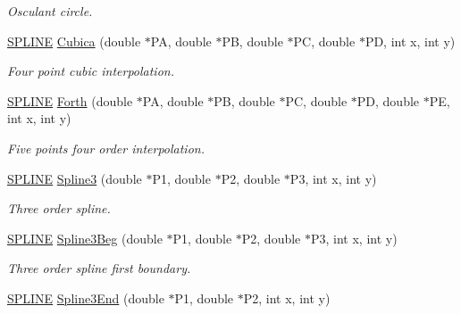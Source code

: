 \begin{DoxyCompactItemize}
\begin{DoxyCompactList}\small\item\em \-Osculant circle. \end{DoxyCompactList}\item 
\hypertarget{classMatematica_acc21ee420953fcc9d0587f56324631cb}{\hyperlink{structSPLINE}{\-S\-P\-L\-I\-N\-E} \hyperlink{classMatematica_acc21ee420953fcc9d0587f56324631cb}{\-Cubica} (double $\ast$\-P\-A, double $\ast$\-P\-B, double $\ast$\-P\-C, double $\ast$\-P\-D, int x, int y)}\label{classMatematica_acc21ee420953fcc9d0587f56324631cb}

\begin{DoxyCompactList}\small\item\em \-Four point cubic interpolation. \end{DoxyCompactList}\item 
\hypertarget{classMatematica_a7eb694853e69b9cbd2020788e9665424}{\hyperlink{structSPLINE}{\-S\-P\-L\-I\-N\-E} \hyperlink{classMatematica_a7eb694853e69b9cbd2020788e9665424}{\-Forth} (double $\ast$\-P\-A, double $\ast$\-P\-B, double $\ast$\-P\-C, double $\ast$\-P\-D, double $\ast$\-P\-E, int x, int y)}\label{classMatematica_a7eb694853e69b9cbd2020788e9665424}

\begin{DoxyCompactList}\small\item\em \-Five points four order interpolation. \end{DoxyCompactList}\item 
\hypertarget{classMatematica_a69f1211856d5b0cd58178a21156d0492}{\hyperlink{structSPLINE}{\-S\-P\-L\-I\-N\-E} \hyperlink{classMatematica_a69f1211856d5b0cd58178a21156d0492}{\-Spline3} (double $\ast$\-P1, double $\ast$\-P2, double $\ast$\-P3, int x, int y)}\label{classMatematica_a69f1211856d5b0cd58178a21156d0492}

\begin{DoxyCompactList}\small\item\em \-Three order spline. \end{DoxyCompactList}\item 
\hypertarget{classMatematica_aa2836a8f43d770c560eb34c3cafa4ceb}{\hyperlink{structSPLINE}{\-S\-P\-L\-I\-N\-E} \hyperlink{classMatematica_aa2836a8f43d770c560eb34c3cafa4ceb}{\-Spline3\-Beg} (double $\ast$\-P1, double $\ast$\-P2, double $\ast$\-P3, int x, int y)}\label{classMatematica_aa2836a8f43d770c560eb34c3cafa4ceb}

\begin{DoxyCompactList}\small\item\em \-Three order spline first boundary. \end{DoxyCompactList}\item 
\hypertarget{classMatematica_a9f4d9bbeaf65d0ee820dc906aaee0128}{\hyperlink{structSPLINE}{\-S\-P\-L\-I\-N\-E} \hyperlink{classMatematica_a9f4d9bbeaf65d0ee820dc906aaee0128}{\-Spline3\-End} (double $\ast$\-P1, double $\ast$\-P2, int x, int y)}\label{classMatematica_a9f4d9bbeaf65d0ee820dc906aaee0128}


\end{DoxyCompactItemize}
